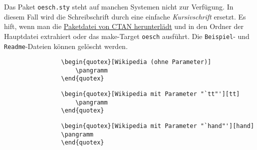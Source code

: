 			\begin{redbox}
				Das Paket \texttt{oesch.sty} steht auf manchen Systemen nicht zur Verfügung. In diesem Fall wird die {\oeschfamily Schreibschrift} durch eine einfache \emph{Kursivschrift} ersetzt. Es hift, wenn man die \href{https://www.ctan.org/tex-archive/fonts/oesch?lang=de}{Paketdatei von CTAN herunterlädt} und in den Ordner der Hauptdatei extrahiert oder das make-Target \texttt{oesch} ausführt. Die \texttt{Beispiel}- und \texttt{Readme}-Dateien können gelöscht werden.
			\end{redbox}


			\begin{verbatim}
				\begin{quotex}[Wikipedia (ohne Parameter)]
				    \pangramm
				\end{quotex}
			\end{verbatim}


			\begin{verbatim}
				\begin{quotex}[Wikipedia mit Parameter "`tt"'][tt]
				    \pangramm
				\end{quotex}
			\end{verbatim}


			\begin{verbatim}
				\begin{quotex}[Wikipedia mit Parameter "`hand"'][hand]
				\pangramm
				\end{quotex}
			\end{verbatim}


